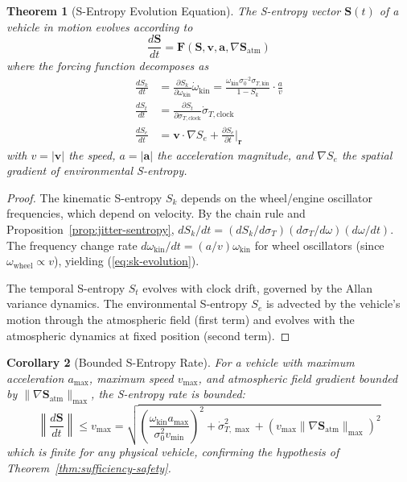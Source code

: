 \documentclass[twocolumn,10pt]{article}
\newtheorem{theorem}{Theorem}[section]
\newtheorem{corollary}[theorem]{Corollary}
\theoremstyle{definition}
\theoremstyle{remark}
\newcommand{\Sent}{\mathbf{S}}
\begin{document}
\begin{theorem}[S-Entropy Evolution Equation]\label{thm:s-evolution}
The S-entropy vector $\Sent(t)$ of a vehicle in motion evolves according to
\begin{equation}\label{eq:s-evolution}
  \frac{d\Sent}{dt} = \mathbf{F}(\Sent, \mathbf{v}, \mathbf{a},
  \nabla \Sent_{\mathrm{atm}})
\end{equation}
where the forcing function decomposes as
\begin{align}
  \frac{dS_k}{dt} &= \frac{\partial S_k}{\partial \omega_{\mathrm{kin}}}
    \dot{\omega}_{\mathrm{kin}}
    = \frac{\omega_{\mathrm{kin}} \sigma_0^{-2} \sigma_{T,\mathrm{kin}}}
    {1 - S_k} \cdot \frac{a}{v}
    \label{eq:sk-evolution} \\
  \frac{dS_t}{dt} &= \frac{\partial S_t}{\partial \sigma_{T,\mathrm{clock}}}
    \dot{\sigma}_{T,\mathrm{clock}}
    \label{eq:st-evolution} \\
  \frac{dS_e}{dt} &= \mathbf{v} \cdot \nabla S_e
    + \frac{\partial S_e}{\partial t}\bigg|_{\mathbf{r}}
    \label{eq:se-evolution}
\end{align}
with $v = |\mathbf{v}|$ the speed, $a = |\mathbf{a}|$ the acceleration
magnitude, and $\nabla S_e$ the spatial gradient of environmental S-entropy.
\end{theorem}

\begin{proof}
The kinematic S-entropy $S_k$ depends on the wheel/engine oscillator
frequencies, which depend on velocity. By the chain rule and
Proposition~\ref{prop:jitter-sentropy},
$dS_k/dt = (dS_k/d\sigma_T)(d\sigma_T/d\omega)(d\omega/dt)$.
The frequency change rate $d\omega_{\mathrm{kin}}/dt = (a/v)
\omega_{\mathrm{kin}}$ for wheel oscillators (since
$\omega_{\mathrm{wheel}} \propto v$), yielding (\ref{eq:sk-evolution}).

The temporal S-entropy $S_t$ evolves with clock drift, governed by the
Allan variance dynamics. The environmental S-entropy $S_e$ is advected
by the vehicle's motion through the atmospheric field (first term) and
evolves with the atmospheric dynamics at fixed position (second term).
\end{proof}

\begin{corollary}[Bounded S-Entropy Rate]\label{cor:bounded-rate}
For a vehicle with maximum acceleration $a_{\max}$, maximum speed
$v_{\max}$, and atmospheric field gradient bounded by
$\|\nabla \Sent_{\mathrm{atm}}\|_{\max}$, the S-entropy rate is bounded:
\begin{equation}\label{eq:bounded-s-rate}
  \left\|\frac{d\Sent}{dt}\right\| \leq v_{\max} =
  \sqrt{\left(\frac{\omega_{\mathrm{kin}} a_{\max}}
  {\sigma_0^2 v_{\min}}\right)^2 +
  \dot{\sigma}_{T,\max}^2 +
  (v_{\max} \|\nabla \Sent_{\mathrm{atm}}\|_{\max})^2}
\end{equation}
which is finite for any physical vehicle, confirming the hypothesis
of Theorem~\ref{thm:sufficiency-safety}.
\end{corollary}
\end{document}
